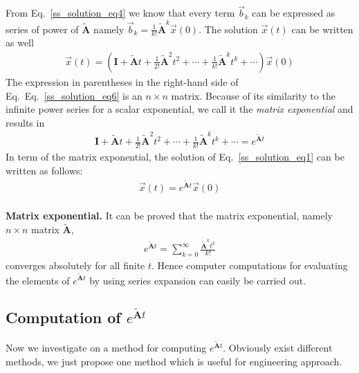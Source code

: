 \documentclass[11pt,a4paper,oneside]{book}
\numberwithin{equation}{section}
\theoremstyle{it}
\theoremstyle{definition}
\begin{document}
From Eq.~\eqref{ss_solution_eq4} we know that every term $\vec{b}_k$ can be 
expressed as series of power of $\tilde{\mathbf{A}}$ namely $\vec{b}_k = 
\frac{1}{k!} \tilde{\mathbf{A}}^k \vec{x}(0)$. The solution $\vec{x}(t)$ can be 
written as well
\begin{equation}\label{ss_solution_eq6}
	\begin{aligned}
		\vec{x}(t) = \left(\mathbf{I} + \tilde{\mathbf{A}}t+\frac{1}{2!}\tilde{\mathbf{A}}^2t^2+\cdots+\frac{1}{k!}\tilde{\mathbf{A}}^kt^k+\cdots\right)\vec{x}(0)
	\end{aligned}
\end{equation}
The expression in parentheses in the right-hand side of 
Eq.~Eq.~\eqref{ss_solution_eq6} is an $n \times n$ matrix. Because of its 
similarity to the infinite power series for a scalar exponential, we call it 
the \textit{matrix exponential} and results in 
\begin{equation}\label{ss_solution_eq7}
	\begin{aligned}
		\mathbf{I} + \tilde{\mathbf{A}}t+\frac{1}{2!}\tilde{\mathbf{A}}^2t^2+\cdots+\frac{1}{k!}\tilde{\mathbf{A}}^kt^k+\cdots=e^{\tilde{\mathbf{A}}t}
	\end{aligned}
\end{equation}
In term of the matrix exponential, the solution of Eq.~\eqref{ss_solution_eq1} 
can be written as follows:
\begin{equation}\label{ss_solution_eq8}
	\begin{aligned}
		\vec{x}(t) = e^{\tilde{\mathbf{A}}t}\vec{x}(0)
	\end{aligned}
\end{equation}\\
\textbf{Matrix exponential.} It can be proved that the matrix exponential, 
namely $n \times n$ matrix $\tilde{\mathbf{A}}$,
\begin{equation}\label{ss_solution_eq9}
	\begin{aligned}
		e^{\tilde{\mathbf{A}}t}= \sum_{k=0}^{\infty}\frac{\tilde{\mathbf{A}}^kt^k}{k!}
	\end{aligned}
\end{equation}
converges absolutely for all finite $t$. Hence computer computations for evaluating the elements of $e^{\tilde{\mathbf{A}}t}$ by using series expansion can easily be carried out.
\subsection{Computation of $e^{\tilde{\mathbf{A}}t}$}
Now we investigate on a method for computing $e^{\tilde{\mathbf{A}}t}$. Obviously exist different methods, we just propose one method which is useful for engineering approach.
\end{document}
